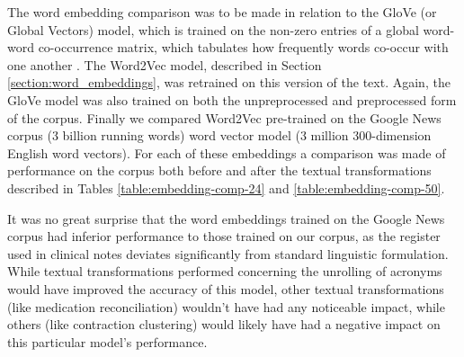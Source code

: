 The word embedding comparison was to be made in relation to the GloVe (or Global Vectors) model, which is trained on the non-zero entries of a global word-word co-occurrence matrix, which tabulates how frequently words co-occur with one another \cite{pennington2014glove}.  The Word2Vec model, described in Section \ref{section:word_embeddings}, was retrained on this version of the text. Again, the GloVe model was also trained on both the unpreprocessed and preprocessed form of the corpus. Finally we compared Word2Vec pre-trained on the Google News corpus (3 billion running words) word vector model (3 million 300-dimension English word vectors).
For each of these embeddings a comparison was made of performance on the corpus both before and after the textual transformations described in Tables \ref{table:embedding-comp-24} and \ref{table:embedding-comp-50}.








It was no great surprise that the word embeddings trained on the Google News corpus had inferior performance to those trained on our corpus, as the register used in clinical notes deviates significantly from standard linguistic formulation. While textual transformations performed concerning the unrolling of acronyms would have improved the accuracy of this model, other textual transformations (like medication reconciliation) wouldn't have had any noticeable impact, while others (like contraction clustering) would likely have had a negative impact on this particular model's performance. 

\begin{table}[ht]

\setlength{\tabcolsep}{9pt}
      \centering
\caption{Performance relating to word embedding method: t(24).}
\label{table:embedding-comp-24}
\end{table}

